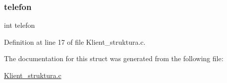 \subsubsection{\texorpdfstring{telefon}{telefon}}
{\footnotesize\ttfamily int telefon}



Definition at line 17 of file Klient\+\_\+struktura.\+c.



The documentation for this struct was generated from the following file\+:\begin{DoxyCompactItemize}
\item 
\hyperlink{_klient__struktura_8c}{Klient\+\_\+struktura.\+c}\end{DoxyCompactItemize}
